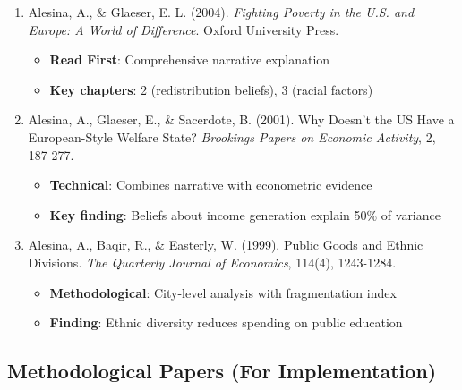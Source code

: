 \begin{enumerate}

\item Alesina, A., \& Glaeser, E. L. (2004). \emph{Fighting Poverty in the U.S. and Europe: A World of Difference}.
   Oxford University Press.
   \begin{itemize}
   \item \textbf{Read First}: Comprehensive narrative explanation
   \item \textbf{Key chapters}: 2 (redistribution beliefs), 3 (racial factors)
   \end{itemize}

\item Alesina, A., Glaeser, E., \& Sacerdote, B. (2001). Why Doesn't the US Have a European-Style Welfare State? \emph{Brookings Papers on Economic Activity}, 2, 187-277.
   \begin{itemize}
   \item \textbf{Technical}: Combines narrative with econometric evidence
   \item \textbf{Key finding}: Beliefs about income generation explain 50\% of variance
   \end{itemize}

\item Alesina, A., Baqir, R., \& Easterly, W. (1999). Public Goods and Ethnic Divisions. \emph{The Quarterly Journal of Economics}, 114(4), 1243-1284.
   \begin{itemize}
   \item \textbf{Methodological}: City-level analysis with fragmentation index
   \item \textbf{Finding}: Ethnic diversity reduces spending on public education
   \end{itemize}

\end{enumerate}

\subsection{Methodological Papers (For Implementation)}

